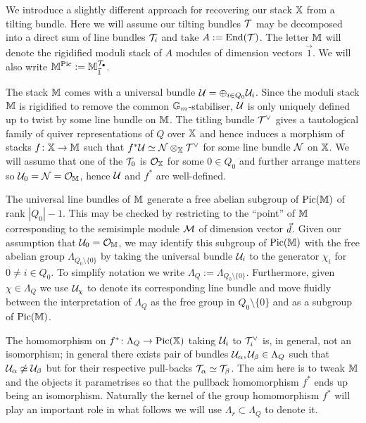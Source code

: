 \documentclass[12pt]{amsart}
\begin{document}
We introduce a slightly different approach for recovering our stack $\mathbb{X}$ from a tilting bundle.
Here we will assume our tilting bundles $\mathcal{T}$ may be decomposed into a direct sum of line bundles $\mathcal{T}_i$ and take $A := \operatorname{End}(\mathcal{T})$.
The letter $\mathbb{M}$ will denote the rigidified moduli stack of $A$ modules of dimension vectors $\vec{1}$.
We will also write $\mathbb{M}^{\operatorname{Pic}}:= \mathbb{M}_{\vec{1}}^{\mathcal{T}_\bullet}$.

The stack $\mathbb{M}$ comes with a universal bundle $\mathcal{U}  = \oplus_{i \in Q_0} \mathcal{U}_i$.
Since the moduli stack $\mathbb{M}$ is rigidified to remove the common $\mathbb{G}_m$-stabiliser, $\mathcal{U}$ is only uniquely defined up to twist by some line bundle on $\mathbb{M}$.
The titling bundle $\mathcal{T}^{\vee}$ gives a tautological family of quiver representations of $Q$ over $\mathbb{X}$ and hence induces a morphism of stacks $f \colon \mathbb{X} \rightarrow \mathbb{M}$ such that $f^* \mathcal{U} \simeq \mathcal{N} \otimes_{\mathbb{X}} \mathcal{T}^{\vee}$ for some line bundle $\mathcal{N}$ on $\mathbb{X}$.
We will assume that one of the $\mathcal{T}_0$ is $\mathcal{O}_{\mathbb{X}}$ for some $0 \in Q_0$ and further arrange matters so $\mathcal{U}_0 = \mathcal{N} = \mathcal{O}_{\mathbb{M}}$, hence $\mathcal{U}$ and $f^*$ are well-defined.

The universal line bundles of $\mathbb{M}$ generate a free abelian subgroup of $\operatorname{Pic}(\mathbb{M})$ of rank $|Q_0|-1$.
This may be checked by restricting to the ``point'' of $\mathbb{M}$ corresponding to the semisimple module $\mathcal{M}$ of dimension vector ${\vec{d}}$.
Given our assumption that $\mathcal{U}_0 = \mathcal{O}_{\mathbb{M}}$, we may identify this subgroup of $\operatorname{Pic}(\mathbb{M})$ with the free abelian group $\Lambda_{Q_0 \setminus \{0\}}$ by taking the universal bundle $\mathcal{U}_i$ to the generator $\chi_i$ for $0 \neq i \in Q_0$.
To simplify notation we write $\Lambda_Q:= \Lambda_{Q_0 \setminus \{0\}}$.
Furthermore, given $\chi \in \Lambda_Q$ we use $\mathcal{U}_\chi$ to denote its corresponding line bundle and move fluidly between the interpretation of $\Lambda_Q$ as the free group in ${Q_0 \setminus \{0\}}$ and as a subgroup of $\operatorname{Pic}(\mathbb{M})$.

The homomorphism on $f^* \colon \Lambda_Q \rightarrow \operatorname{Pic}(\mathbb{X})$ taking $\mathcal{U}_i$ to $\mathcal{T}_i^\vee$ is, in general, not an isomorphism; in general there exists pair of bundles $\mathcal{U}_\alpha, \mathcal{U}_\beta \in \Lambda_Q$ such that $\mathcal{U}_\alpha \not\simeq \mathcal{U}_\beta$ but for their respective pull-backs $\mathcal{T}_\alpha \simeq \mathcal{T}_\beta$.
The aim here is to tweak $\mathbb{M}$ and the objects it parametrises so that the pullback homomorphism $f^*$ ends up being an isomorphism.
Naturally the kernel of the group homomorphism $f^*$ will play an important role in what follows we will use $\Lambda_r \subset \Lambda_{Q}$ to denote it.
\end{document}
